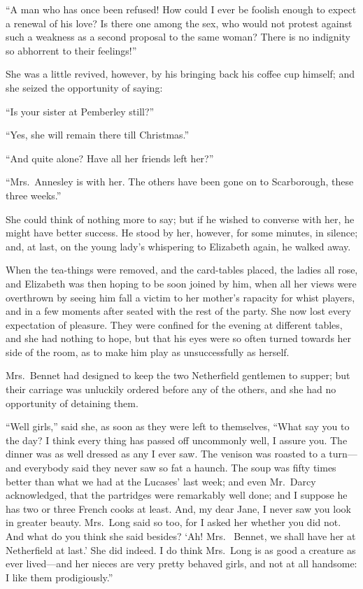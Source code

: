 ``A man who has once been refused!  How could I ever be foolish
enough to expect a renewal of his love?  Is there one among the
sex, who would not protest against such a weakness as a second
proposal to the same woman?  There is no indignity so abhorrent
to their feelings!''

She was a little revived, however, by his bringing back his
coffee cup himself; and she seized the opportunity of saying:

``Is your sister at Pemberley still?''

``Yes, she will remain there till Christmas.''

``And quite alone?  Have all her friends left her?''

``Mrs.\ Annesley is with her.  The others have been gone on to
Scarborough, these three weeks.''

She could think of nothing more to say; but if he wished to
converse with her, he might have better success.  He stood by
her, however, for some minutes, in silence; and, at last, on
the young lady's whispering to Elizabeth again, he walked away.

When the tea-things were removed, and the card-tables placed,
the ladies all rose, and Elizabeth was then hoping to be soon
joined by him, when all her views were overthrown by seeing him
fall a victim to her mother's rapacity for whist players, and
in a few moments after seated with the rest of the party.  She
now lost every expectation of pleasure.  They were confined for
the evening at different tables, and she had nothing to hope,
but that his eyes were so often turned towards her side of the
room, as to make him play as unsuccessfully as herself.

Mrs.\ Bennet had designed to keep the two Netherfield gentlemen
to supper; but their carriage was unluckily ordered before any
of the others, and she had no opportunity of detaining them.

``Well girls,'' said she, as soon as they were left to themselves,
``What say you to the day?  I think every thing has passed off
uncommonly well, I assure you.  The dinner was as well dressed
as any I ever saw.  The venison was roasted to a turn---and
everybody said they never saw so fat a haunch.  The soup was
fifty times better than what we had at the Lucases' last week;
and even Mr.\ Darcy acknowledged, that the partridges were
remarkably well done; and I suppose he has two or three French
cooks at least.  And, my dear Jane, I never saw you look in
greater beauty.  Mrs.\ Long said so too, for I asked her whether
you did not.  And what do you think she said besides? `Ah! Mrs.\ %
Bennet, we shall have her at Netherfield at last.'  She did
indeed.  I do think Mrs.\ Long is as good a creature as ever
lived---and her nieces are very pretty behaved girls, and not
at all handsome: I like them prodigiously.''

